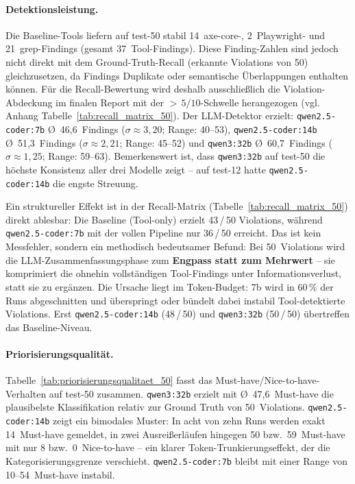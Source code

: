 \paragraph{Detektionsleistung.}
Die Baseline-Tools liefern auf test-50 stabil 14~axe-core-, 2~Playwright- und 21~grep-Findings (gesamt 37~Tool-Findings). Diese Finding-Zahlen sind jedoch nicht direkt mit dem Ground-Truth-Recall (erkannte Violations von 50) gleichzusetzen, da Findings Duplikate oder semantische Überlappungen enthalten können. Für die Recall-Bewertung wird deshalb ausschließlich die Violation-Abdeckung im finalen Report mit der $>\,5/10$-Schwelle herangezogen (vgl. Anhang Tabelle~\ref{tab:recall_matrix_50}). Der \ac{LLM}-Detektor erzielt: \texttt{qwen2.5-coder:7b} \O{}~46{,}6~Findings ($\sigma \approx 3{,}20$; Range: 40--53), \texttt{qwen2.5-coder:14b} \O{}~51{,}3~Findings ($\sigma \approx 2{,}21$; Range: 45--52) und \texttt{qwen3:32b} \O{}~60{,}7~Findings ($\sigma \approx 1{,}25$; Range: 59--63). Bemerkenswert ist, dass \texttt{qwen3:32b} auf test-50 die höchste Konsistenz aller drei Modelle zeigt -- auf test-12 hatte \texttt{qwen2.5-coder:14b} die engste Streuung.

Ein struktureller Effekt ist in der Recall-Matrix (Tabelle~\ref{tab:recall_matrix_50}) direkt ablesbar: Die Baseline (Tool-only) erzielt 43\,/\,50 Violations, während \texttt{qwen2.5-coder:7b} mit der vollen Pipeline nur 36\,/\,50 erreicht. Das ist kein Messfehler, sondern ein methodisch bedeutsamer Befund: Bei 50~Violations wird die \ac{LLM}-Zusammenfassungsphase zum \textbf{Engpass statt zum Mehrwert} -- sie komprimiert die ohnehin vollständigen Tool-Findings unter Informationsverlust, statt sie zu ergänzen. Die Ursache liegt im Token-Budget: 7b wird in 60\,\% der Runs abgeschnitten und überspringt oder bündelt dabei instabil Tool-detektierte Violations. Erst \texttt{qwen2.5-coder:14b} (48\,/\,50) und \texttt{qwen3:32b} (50\,/\,50) übertreffen das Baseline-Niveau.

\paragraph{Priorisierungsqualität.}
Tabelle~\ref{tab:priorisierungsqualitaet_50} fasst das Must-have/Nice-to-have-Verhalten auf test-50 zusammen. \texttt{qwen3:32b} erzielt mit \O{}~47{,}6~Must-have die plausibelste Klassifikation relativ zur Ground Truth von 50~Violations. \texttt{qwen2.5-coder:14b} zeigt ein bimodales Muster: In acht von zehn Runs werden exakt 14~Must-have gemeldet, in zwei Ausreißerläufen hingegen 50 bzw.\ 59~Must-have mit nur 8 bzw.\ 0~Nice-to-have -- ein klarer Token-Trunkierungseffekt, der die Kategorisierungsgrenze verschiebt. \texttt{qwen2.5-coder:7b} bleibt mit einer Range von 10--54~Must-have instabil.

